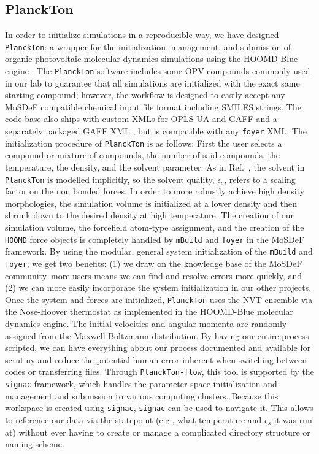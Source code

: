 \subsection{PlanckTon}
In order to initialize simulations in a reproducible way, we have designed \texttt{PlanckTon}: a wrapper for the initialization, management, and submission of organic photovoltaic molecular dynamics simulations using the HOOMD-Blue engine \citep{planckton, Jankowski2019, Anderson2020}.
The \texttt{PlanckTon} software includes some OPV compounds commonly used in our lab to guarantee that all simulations are initialized with the exact same starting compound; however, the workflow is designed to easily accept any MoSDeF compatible chemical input file format including SMILES strings. 
The code base also ships with custom XMLs for OPLS-UA and GAFF and a separately packaged GAFF XML \citep{DeFever}, but is compatible with any \texttt{foyer} XML. 
The initialization procedure of \texttt{PlanckTon} is as follows: First the user selects a compound or mixture of compounds, the number of said compounds, the temperature, the density, and the solvent parameter. 
As in Ref.~\citet{Miller2018}, the solvent in \texttt{PlanckTon} is modelled implicitly, so the solvent quality, $\epsilon_{s}$, refers to a scaling factor on the non bonded forces.
In order to more robustly achieve high density morphologies, the simulation volume is initialized at a lower density and then shrunk down to the desired density at high temperature\cite{Jankowski2013,Marsh2014,Jones2017,Henry2017a,Miller2018}. 
The creation of our simulation volume, the forcefield atom-type assignment, and the creation of the \texttt{HOOMD} force objects is completely handled by \texttt{mBuild} and \texttt{foyer} in the MoSDeF framework\citep{mbuild,foyer}.
By using the modular, general system initialization of the \texttt{mBuild} and \texttt{foyer}, we get two benefits: (1) we draw on the knowledge base of the MoSDeF community--more users means we can find and resolve errors more quickly, and (2) we can more easily incorporate the system initialization in our other projects. 
Once the system and forces are initialized, \texttt{PlanckTon} uses the NVT ensemble via the Nosé-Hoover thermostat \citep{Martyna1994d, Martyna1996} as implemented in the HOOMD-Blue molecular dynamics engine. 
The initial velocities and angular momenta are randomly assigned from the Maxwell-Boltzmann distribution.
By having our entire process scripted, we can have everything about our process documented and available for scrutiny and reduce the potential human error inherent when switching between codes or transferring files.
Through \texttt{PlanckTon-flow}, this tool is supported by the \texttt{signac} framework, which handles the parameter space initialization and management and submission to various computing clusters. Because this workspace is created using \texttt{signac}, \texttt{signac} can be used to navigate it. This allows to reference our data via the statepoint (e.g., what temperature and $\epsilon_{s}$ it was run at) without ever having to create or manage a complicated directory structure or naming scheme.

